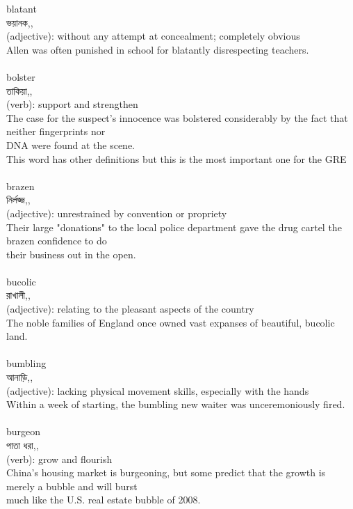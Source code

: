 \documentclass{article}
\begin{document}
{blatant}\\
{ভয়ানক,,}\\
{(adjective): without any attempt at concealment; completely obvious\\Allen was often punished in school for blatantly disrespecting teachers.\\}\\
{bolster}\\
{তাকিয়া,,}\\
{(verb): support and strengthen\\The case for the suspect's innocence was bolstered considerably by the fact that neither fingerprints nor\\DNA were found at the scene.\\This word has other definitions but this is the most important one for the GRE\\}\\
{brazen}\\
{নির্লজ্জ,,}\\
{(adjective): unrestrained by convention or propriety\\Their large "donations" to the local police department gave the drug cartel the brazen confidence to do\\their business out in the open.\\}\\
{bucolic}\\
{রাখালী,,}\\
{(adjective): relating to the pleasant aspects of the country\\The noble families of England once owned vast expanses of beautiful, bucolic land.\\}\\
{bumbling}\\
{আনাড়ি,,}\\
{(adjective): lacking physical movement skills, especially with the hands\\Within a week of starting, the bumbling new waiter was unceremoniously fired.\\}\\
{burgeon}\\
{পাতা ধরা,,}\\
{(verb): grow and flourish\\China's housing market is burgeoning, but some predict that the growth is merely a bubble and will burst\\much like the U.S. real estate bubble of 2008.\\}\\
\end{document}
